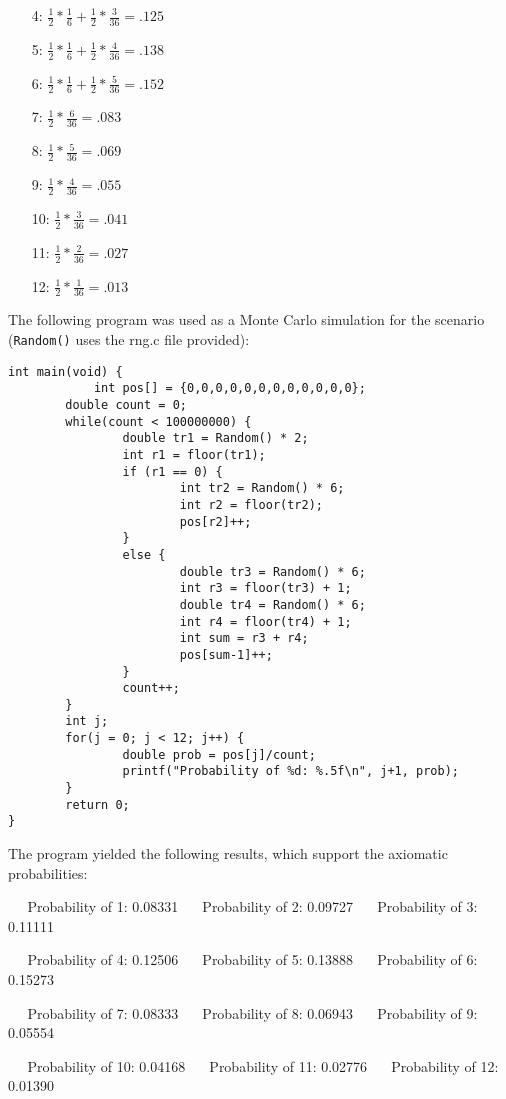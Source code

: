 \documentclass[11pt]{article} %
\newcommand{\tab}{\;\;\;\;\;}
\begin{document}
\begin{enumerate}
\begin{enumerate}
\item[4:] $\frac{1}{2}*\frac{1}{6} + \frac{1}{2}*\frac{3}{36} = .125$

\item[5:] $\frac{1}{2}*\frac{1}{6} + \frac{1}{2}*\frac{4}{36} = .138$

\item[6:] $\frac{1}{2}*\frac{1}{6} + \frac{1}{2}*\frac{5}{36} = .152$

\item[7:] $\frac{1}{2}*\frac{6}{36} = .083$

\item[8:] $\frac{1}{2}*\frac{5}{36} = .069$

\item[9:] $\frac{1}{2}*\frac{4}{36} = .055$

\item[10:] $\frac{1}{2}*\frac{3}{36} = .041$

\item[11:] $\frac{1}{2}*\frac{2}{36} = .027$

\item[12:] $\frac{1}{2}*\frac{1}{36} = .013$

\end{enumerate}

The following program was used as a Monte Carlo simulation for the scenario (\texttt{Random()} uses the rng.c file provided):

{\small{\begin{verbatim}
int main(void) {
        	int pos[] = {0,0,0,0,0,0,0,0,0,0,0,0};
        double count = 0;
        while(count < 100000000) {
                double tr1 = Random() * 2;
                int r1 = floor(tr1);
                if (r1 == 0) {
                        int tr2 = Random() * 6;
                        int r2 = floor(tr2);
                        pos[r2]++;
                }
                else {
                        double tr3 = Random() * 6;
                        int r3 = floor(tr3) + 1;
                        double tr4 = Random() * 6;
                        int r4 = floor(tr4) + 1;
                        int sum = r3 + r4;
                        pos[sum-1]++;
                }
                count++;
        }
        int j;
        for(j = 0; j < 12; j++) {
                double prob = pos[j]/count;
                printf("Probability of %d: %.5f\n", j+1, prob);
        }
        return 0;
}	
\end{verbatim}}}

The program yielded the following results, which support the axiomatic probabilities:

$\tab$Probability of 1: 0.08331
$\tab$Probability of 2: 0.09727
$\tab$Probability of 3: 0.11111

$\tab$Probability of 4: 0.12506
$\tab$Probability of 5: 0.13888
$\tab$Probability of 6: 0.15273

$\tab$Probability of 7: 0.08333
$\tab$Probability of 8: 0.06943
$\tab$Probability of 9: 0.05554

$\tab$Probability of 10: 0.04168
$\tab$Probability of 11: 0.02776
$\tab$Probability of 12: 0.01390

\end{enumerate}
\end{document}
